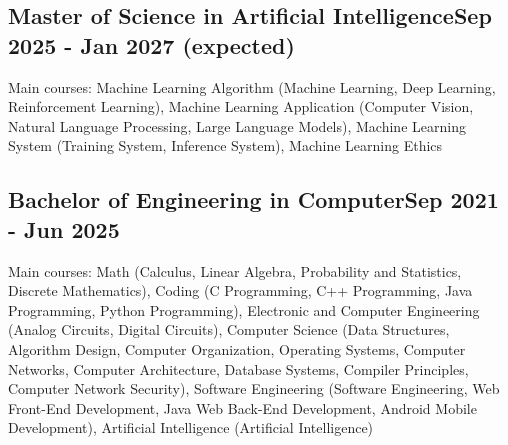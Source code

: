 \vspace*{10pt}
\subsection {{Master of Science in Artificial Intelligence}\hfill Sep 2025 - Jan 2027 (expected)}
\vspace*{5pt}
Main courses: Machine Learning Algorithm (Machine Learning, Deep Learning, Reinforcement Learning), Machine Learning Application (Computer Vision, Natural Language Processing, Large Language Models),  Machine Learning System (Training System, Inference System), Machine Learning Ethics

\vspace*{6pt}
\subsection{{Bachelor of Engineering in Computer}\hfill Sep 2021 - Jun 2025}
\vspace*{5pt}
Main courses: Math (Calculus, Linear Algebra, Probability and Statistics, Discrete Mathematics), Coding (C Programming, C++ Programming, Java Programming, Python Programming), Electronic and Computer Engineering (Analog Circuits, Digital Circuits), Computer Science (Data Structures, Algorithm Design, Computer Organization, Operating Systems, Computer Networks, Computer Architecture, Database Systems, Compiler Principles, Computer Network Security), Software Engineering (Software Engineering, Web Front-End Development, Java Web Back-End Development, Android Mobile Development), Artificial Intelligence (Artificial Intelligence)
